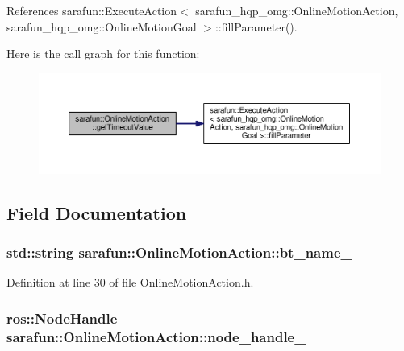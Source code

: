 References sarafun\-::\-Execute\-Action$<$ sarafun\-\_\-hqp\-\_\-omg\-::\-Online\-Motion\-Action, sarafun\-\_\-hqp\-\_\-omg\-::\-Online\-Motion\-Goal $>$\-::fill\-Parameter().



Here is the call graph for this function\-:
\nopagebreak
\begin{figure}[H]
\begin{center}
\leavevmode
\includegraphics[width=350pt]{d0/d3c/classsarafun_1_1OnlineMotionAction_a453e7dca41a0d73b5297ce191e760b31_a453e7dca41a0d73b5297ce191e760b31_cgraph}
\end{center}
\end{figure}




\subsection{Field Documentation}
\hypertarget{classsarafun_1_1OnlineMotionAction_aa82a73fea4355036ae0faa473608e5bb_aa82a73fea4355036ae0faa473608e5bb}{
\subsubsection[{bt\-\_\-name\-\_\-}]{\setlength{\rightskip}{0pt plus 5cm}std\-::string sarafun\-::\-Online\-Motion\-Action\-::bt\-\_\-name\-\_\-\hspace{0.3cm}{\ttfamily [private]}}}\label{classsarafun_1_1OnlineMotionAction_aa82a73fea4355036ae0faa473608e5bb_aa82a73fea4355036ae0faa473608e5bb}


Definition at line 30 of file Online\-Motion\-Action.\-h.

\hypertarget{classsarafun_1_1OnlineMotionAction_af14d66bb4bd818b4847f76b0f85eb35b_af14d66bb4bd818b4847f76b0f85eb35b}{
\subsubsection[{node\-\_\-handle\-\_\-}]{\setlength{\rightskip}{0pt plus 5cm}ros\-::\-Node\-Handle sarafun\-::\-Online\-Motion\-Action\-::node\-\_\-handle\-\_\-\hspace{0.3cm}{\ttfamily [private]}}}\label{classsarafun_1_1OnlineMotionAction_af14d66bb4bd818b4847f76b0f85eb35b_af14d66bb4bd818b4847f76b0f85eb35b}


